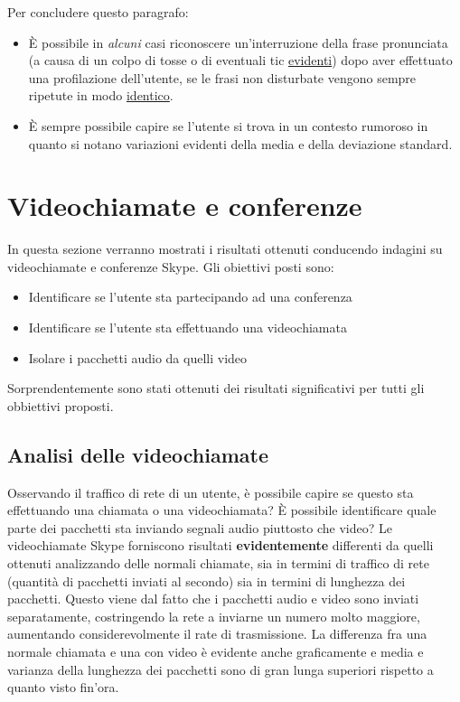 Per concludere questo paragrafo:

\begin{itemize}
\item È possibile in \emph{alcuni} casi riconoscere un'interruzione della frase pronunciata (a causa di un colpo di tosse o di eventuali tic \underline{evidenti}) dopo aver effettuato una profilazione dell'utente, se le frasi non disturbate vengono sempre ripetute in modo \underline{identico}.
\item È sempre possibile capire se l'utente si trova in un contesto rumoroso in quanto si notano variazioni evidenti della media e della deviazione standard.
\end{itemize}

\section{Videochiamate e conferenze}

In questa sezione verranno mostrati i risultati ottenuti conducendo indagini su videochiamate e conferenze Skype. Gli obiettivi posti sono:

\begin{itemize}
\item Identificare se l'utente sta partecipando ad una conferenza
\item Identificare se l'utente sta effettuando una videochiamata
\item Isolare i pacchetti audio da quelli video
\end{itemize}

Sorprendentemente sono stati ottenuti dei risultati significativi per tutti gli obbiettivi proposti.

\subsection{Analisi delle videochiamate}

Osservando il traffico di rete di un utente, è possibile capire se questo sta effettuando una chiamata o una videochiamata? È possibile identificare quale parte dei pacchetti sta inviando segnali audio piuttosto che video?\newline
Le videochiamate Skype forniscono risultati \textbf{evidentemente} differenti da quelli ottenuti analizzando delle normali chiamate, sia in termini di traffico di rete (quantità di pacchetti inviati al secondo) sia in termini di lunghezza dei pacchetti.\newline
Questo viene dal fatto che i pacchetti audio e video sono inviati separatamente, costringendo la rete a inviarne un numero molto maggiore, aumentando considerevolmente il rate di trasmissione. La differenza fra una normale chiamata e una con video è evidente anche graficamente e media e varianza della lunghezza dei pacchetti sono di gran lunga superiori rispetto a quanto visto fin'ora.

